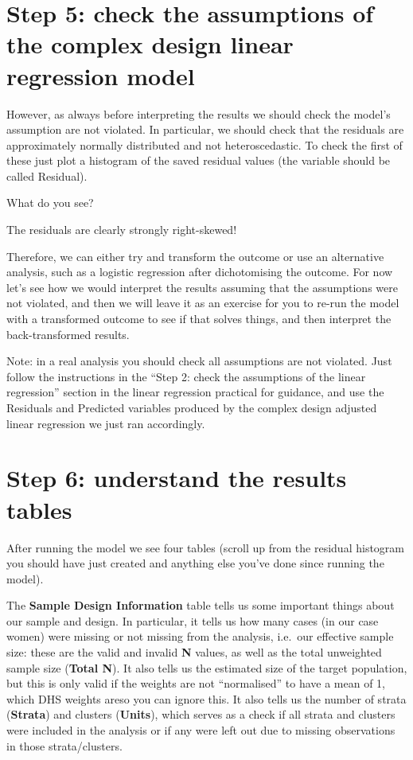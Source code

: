 \documentclass[
]{book}
\begin{document}
\hypertarget{step-5-check-the-assumptions-of-the-complex-design-linear-regression-model}{%
\section{Step 5: check the assumptions of the complex design linear regression model}\label{step-5-check-the-assumptions-of-the-complex-design-linear-regression-model}}

However, as always before interpreting the results we should check the model's assumption are not violated. In particular, we should check that the residuals are approximately normally distributed and not heteroscedastic. To check the first of these just plot a histogram of the saved residual values (the variable should be called Residual).

What do you see?

The residuals are clearly strongly right-skewed!

Therefore, we can either try and transform the outcome or use an alternative analysis, such as a logistic regression after dichotomising the outcome. For now let's see how we would interpret the results assuming that the assumptions were not violated, and then we will leave it as an exercise for you to re-run the model with a transformed outcome to see if that solves things, and then interpret the back-transformed results.

Note: in a real analysis you should check all assumptions are not violated. Just follow the instructions in the ``Step 2: check the assumptions of the linear regression'' section in the linear regression practical for guidance, and use the Residuals and Predicted variables produced by the complex design adjusted linear regression we just ran accordingly.

\hypertarget{step-6-understand-the-results-tables}{%
\section{Step 6: understand the results tables}\label{step-6-understand-the-results-tables}}

After running the model we see four tables (scroll up from the residual histogram you should have just created and anything else you've done since running the model).

The \textbf{Sample Design Information} table tells us some important things about our sample and design. In particular, it tells us how many cases (in our case women) were missing or not missing from the analysis, i.e.~our effective sample size: these are the valid and invalid \textbf{N} values, as well as the total unweighted sample size (\textbf{Total N}). It also tells us the estimated size of the target population, but this is only valid if the weights are not ``normalised'' to have a mean of 1, which DHS weights areso you can ignore this. It also tells us the number of strata (\textbf{Strata}) and clusters (\textbf{Units}), which serves as a check if all strata and clusters were included in the analysis or if any were left out due to missing observations in those strata/clusters.
\end{document}
